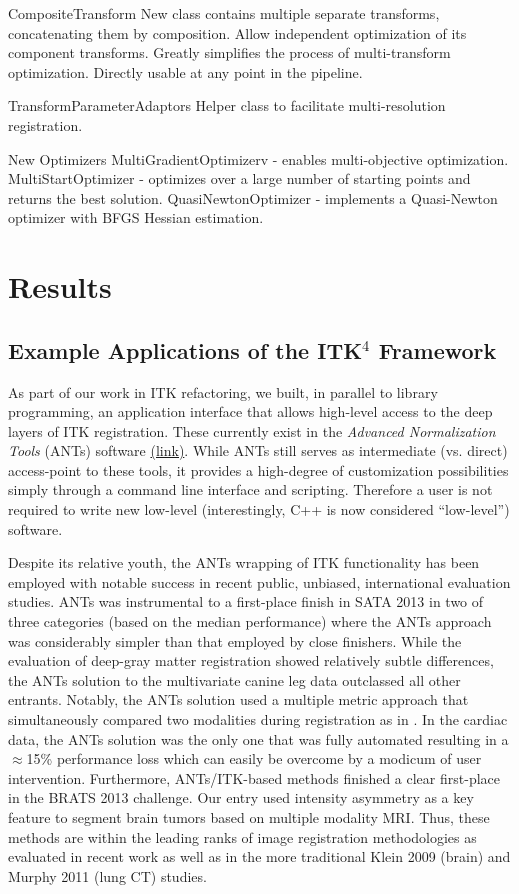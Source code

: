 \documentclass{frontiersSCNS}
\begin{document}
CompositeTransform
New class contains multiple separate transforms, concatenating them by composition.
Allow independent optimization of its component transforms.
Greatly simplifies the process of multi-transform optimization.
Directly usable at any point in the pipeline.

TransformParameterAdaptors
Helper class to facilitate multi-resolution registration.

New Optimizers
MultiGradientOptimizerv - enables multi-objective optimization.
MultiStartOptimizer - optimizes over a large number of starting points and returns the best solution.
QuasiNewtonOptimizer - implements a Quasi-Newton optimizer with BFGS Hessian estimation.





\section{Results}

\subsection{Example Applications of the ITK$^4$ Framework}
\label{sec:applications}
As part of our work in ITK refactoring, we built, in parallel to
library programming, an
application interface that allows high-level access to the deep layers
of ITK registration.  These currently exist in the {\em Advanced
  Normalization Tools} (ANTs) software
\href{http://stnava.github.io/ANTs}{(link)}.  While ANTs still serves
as intermediate (vs. direct) access-point to these tools, it provides
a high-degree of customization possibilities simply through a command
line interface and scripting.  Therefore a user is not required to
write new low-level (interestingly, C++ is now considered ``low-level'') software.  

Despite its relative youth, the ANTs wrapping of ITK functionality has
been employed with notable success in recent public, unbiased,
international evaluation studies.   ANTs was instrumental to a
first-place finish in SATA 2013 in two of three categories (based on
the median performance) where the ANTs approach was considerably
simpler than that employed by close finishers.  While the evaluation
of deep-gray matter registration showed relatively subtle differences,
the ANTs solution to the multivariate
canine leg data outclassed all other entrants.  Notably, the ANTs
solution used a multiple metric approach that simultaneously compared
two modalities during registration as in \cite{Avants2008}.  In the
cardiac data, the ANTs solution was the only one that was fully
automated resulting in a $\approx$15\% performance loss which can easily be
overcome by a modicum of user intervention.   Furthermore, ANTs/ITK-based
methods finished a clear first-place in the BRATS 2013 challenge.  Our entry
used intensity asymmetry as a key feature to segment brain tumors based
on multiple modality MRI.  Thus, these methods are within the leading
ranks of image registration methodologies as evaluated in recent work
as well as in the more traditional Klein 2009 (brain) and Murphy 2011
(lung CT) studies. 
\end{document}
